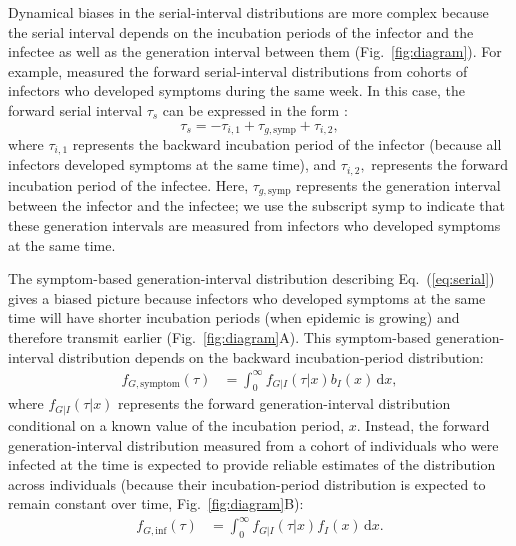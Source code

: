 \documentclass[12pt]{article}
\newcommand{\eref}[1]{Eq.~(\ref{eq:#1})}
\newcommand{\fref}[1]{Fig.~\ref{fig:#1}}
\newcommand{\dd}[1]{\ensuremath{\, \mathrm{d}#1}}
\newcommand{\dx}{\dd{x}}
\begin{document}
Dynamical biases in the serial-interval distributions are more complex because the serial interval depends on the incubation periods of the infector and the infectee as well as the generation interval between them (\fref{diagram}).
For example, \cite{backer2021omicron} measured the forward serial-interval distributions from cohorts of infectors who developed symptoms during the same week.
In this case, the forward serial interval $\tau_s$ can be expressed in the form \citep{park2021forward}:
\begin{equation}
\tau_s =  - \tau_{i, 1} + \tau_{g, \mathrm{symp}} + \tau_{i, 2},
\label{eq:serial}
\end{equation}
where $\tau_{i, 1}$ represents the backward incubation period of the infector (because all infectors developed symptoms at the same time), and $\tau_{i, 2},$ represents the forward incubation period of the infectee.
Here, $\tau_{g, \mathrm{symp}}$ represents the generation interval between the infector and the infectee; we use the subscript $\mathrm{symp}$ to indicate that these generation intervals are measured from infectors who developed symptoms at the same time.

The symptom-based generation-interval distribution describing \eref{serial} gives a biased picture because infectors who developed symptoms at the same time will have shorter incubation periods (when epidemic is growing) and therefore transmit earlier (\fref{diagram}A).
This symptom-based generation-interval distribution depends on the backward incubation-period distribution:
\begin{align}
f_{G, \mathrm{symptom}}(\tau) &= \int_0^\infty f_{G|I}(\tau|x) b_I(x) \dx,
\end{align}
where $f_{G|I}(\tau|x)$ represents the forward generation-interval distribution conditional on a known value of the incubation period, $x$.
Instead, the forward generation-interval distribution measured from a cohort of individuals who were infected at the time is expected to provide reliable estimates of the distribution across individuals (because their incubation-period distribution is expected to remain constant over time, \fref{diagram}B):
\begin{align}
f_{G, \mathrm{inf}}(\tau) &= \int_0^\infty f_{G|I}(\tau|x) f_I(x) \dx.
\label{eq:meangen}
\end{align}
\end{document}
